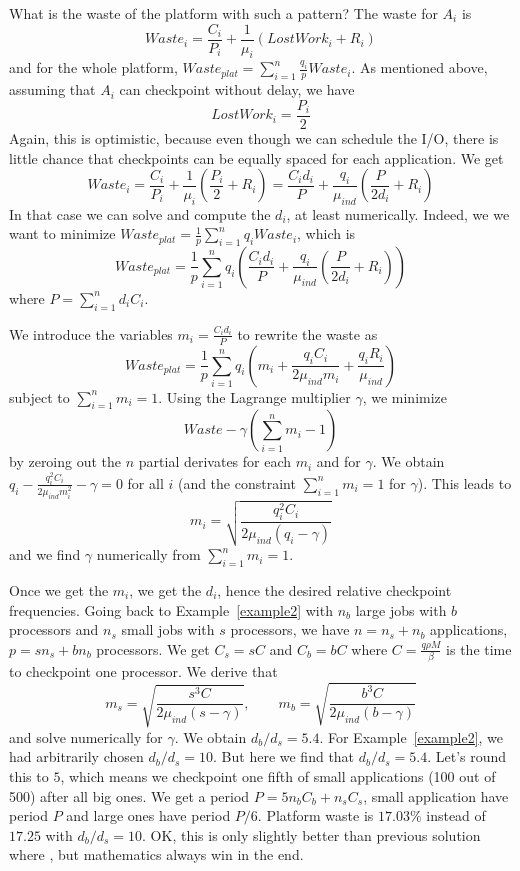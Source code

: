 \documentclass{article}
\newcommand{\ema}[1]{\ensuremath{#1}}
\newcommand{\Waste}{\ema{\mathit{Waste}}\xspace}
\begin{document}
What is the waste of the platform with such a pattern? The waste for $A_{i}$ is 
$$\Waste_{i} = \frac{C_{i}}{P_{i}} + \frac{1}{\mu_{i}} (LostWork_{i} + R_{i})$$
and for the whole platform, $\Waste_{plat} = \sum_{i=1}^{n} \frac{q_{i}}{p} \Waste_{i}$.
As mentioned above, assuming that $A_{i}$ can checkpoint without delay, we have
$$LostWork_{i} = \frac{P_{i}}{2}$$
Again, this is  optimistic, because even though we can schedule the I/O, there is little chance that checkpoints can be equally spaced for each application.
We get
$$\Waste_{i} = \frac{C_{i}}{P_{i}} + \frac{1}{\mu_{i}} (\frac{P_{i}}{2} + R_{i})
= \frac{C_{i} d_{i}}{P}+ \frac{q_{i}}{\mu_{ind}} (\frac{P}{2d_{i}} + R_{i})$$
In that case we can solve and compute the $d_{i}$, at least numerically. 
Indeed, we we want to minimize 
$\Waste_{plat} = \frac{1}{p} \sum_{i=1}^{n} q_{i} \Waste_{i}$, 
which is 
$$\Waste_{plat} = \frac{1}{p} \sum_{i=1}^{n} q_{i} (\frac{C_{i} d_{i}}{P}+ \frac{q_{i}}{\mu_{ind}} (\frac{P}{2d_{i}} + R_{i}))$$
where $P  = \sum_{i=1}^{n} d_{i} C_{i}$.

We introduce the variables $m_{i} = \frac{C_{i} d_{i}}{P}$ to rewrite the waste as
$$\Waste_{plat}= \frac{1}{p} \sum_{i=1}^{n} q_{i} (m_{i}+ \frac{q_{i}C_{i}}{2 \mu_{ind} m_{i}} +\frac{q_{i} R_{i}}{\mu_{ind}})$$
subject to $\sum_{i=1}^{n} m_{i} = 1$.
Using the Lagrange multiplier $\gamma$, we minimize
$$Waste - \gamma (\sum_{i=1}^{n} m_{i} - 1)$$
by zeroing out the $n$ partial derivates for each $m_{i}$ and for $\gamma$.
We obtain
$q_{i} - \frac{q_{i}^{2} C_{i}}{2 \mu_{ind} m_{i}^{2}} - \gamma = 0$ for all $i$ (and the constraint
$\sum_{i=1}^{n} m_{i} = 1$ for $\gamma$). This leads to 
$$m_{i} = \sqrt{\frac{q_{i}^{2} C_{i}}{2 \mu_{ind} (q_{i} - \gamma)}}$$
and we find $\gamma$ numerically from $\sum_{i=1}^{n} m_{i} = 1$.

Once we get the $m_{i}$, we get the $d_{i}$, hence the desired relative checkpoint frequencies.
Going back to Example~\ref{example2} with $n_{b}$ large jobs with $b$ processors
and $n_{s}$ small jobs with $s$ processors,
we have $n = n_{s} + n_{b}$ applications, $p =  s n_{s} + b n_{b}$ processors. We get
$C_{s} = s C$ and $C_{b} = b C$ where $C = \frac{q\rho M}{\beta}$ is the time to checkpoint one processor. We derive that 
$$m_{s} = \sqrt{\frac{s^{3} C}{2 \mu_{ind} (s - \gamma)}}, \qquad m_{b} = \sqrt{\frac{b^{3} C}{2 \mu_{ind} (b - \gamma)}}$$
and solve numerically for $\gamma$. We obtain
$d_{b}/d_{s}=5.4$.
For Example~\ref{example2}, we had arbitrarily chosen $d_{b}/d_{s}=10$.
But here we find that $d_{b}/d_{s}=5.4$. Let's round this to $5$, which means we checkpoint one fifth
of small applications (100 out of 500) after all big ones.
We get a period  $P=5n_{b}C_{b}+n_{s}C_{s}$, small application have period $P$
and large ones have period $P/6$.  Platform waste is $17.03\%$ instead of $17.25$ with $d_{b}/d_{s}=10$.
OK, this is only slightly better than previous solution where , but mathematics 
 always win in the end.
\end{document}
